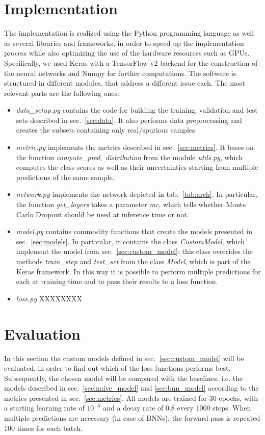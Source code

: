 \documentclass[11pt,twoside,a4paper]{article}
\begin{document}
\section{Implementation}
\label{sec:implementation}
The implementation is realized using the Python programming language as well as several libraries and frameworks, in order to speed up the implementation process while also optimizing the use of the hardware resources such as GPUs. Specifically, we used Keras with a TensorFlow v2 backend for the construction of the neural networks and Numpy for further computations.\newline
The software is structured in different modules, that address a different issue each. The most relevant parts are the following ones:
\begin{itemize}
\item \emph{data\_setup.py} contains the code for building the training, validation and test sets described in sec.~\ref{sec:data}. It also performs data preprocessing and creates the subsets containing only real/spurious samples
\item \emph{metric.py} implements the metrics described in sec.~\ref{sec:metrics}. It bases on the function \emph{compute\_pred\_distribution} from the module \emph{utils.py}, which computes the class scores as well as their uncertainties starting from multiple predictions of the same sample.
\item \emph{network.py} implements the network depicted in tab.~\ref{tab:arch}. In particular, the function \emph{get\_layers} takes a parameter \emph{mc}, which tells whether Monte Carlo Dropout should be used at inference time or not.
\item \emph{model.py} contains commodity functions that create the models presented in sec.~\ref{sec:models}. In particular, it contains the class \emph{CustomModel}, which implement the model from sec.~\ref{sec:custom_model}: this class overrides the methods \emph{train\_step} and \emph{test\_set} from the class \emph{Model}, which is part of the Keras framework. In this way it is possible to perform multiple predictions for each at training time and to pass their results to a loss function.
\item \emph{loss.py} XXXXXXXX
\end{itemize}


\section{Evaluation}
\label{sec:evaluation}
In this section the custom models defined in sec.~\ref{sec:custom_model} will be evaluated, in order to find out which of the loss functions performs best. Subsequently, the chosen model will be compared with the baselines, i.e. the models described in sec.~\ref{sec:naive_model} and \ref{sec:bnn_model} according to the metrics presented in sec.~\ref{sec:metrics}. All models are trained for 30 epochs, with a starting learning rate of \(10^{-5}\) and a decay rate of 0.8 every 1000 steps. When multiple predictions are necessary (in case of BNNs), the forward pass is repeated 100 times for each batch.
\end{document}
